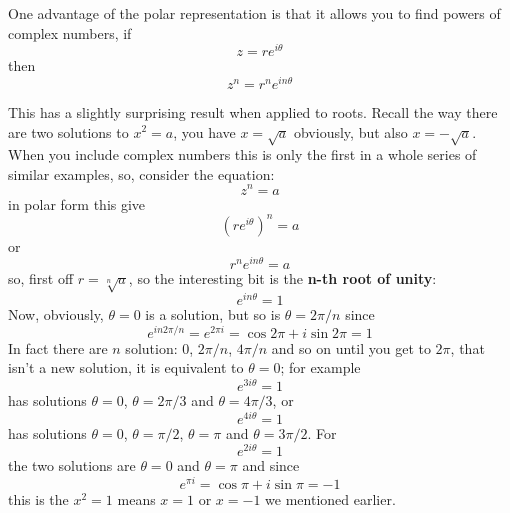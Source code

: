 \documentclass[12pt]{article}
\begin{document}
One advantage of the polar representation is that it allows you to find powers of complex numbers, if
\begin{equation}
  z=re^{i\theta}
\end{equation}
then
\begin{equation}
  z^n=r^ne^{in\theta}
\end{equation}

This has a slightly surprising result when applied to roots. Recall
the way there are two solutions to $x^2=a$, you have $x=\sqrt{a}$
obviously, but also $x=-\sqrt{a}$. When you include complex numbers
this is only the first in a whole series of similar examples, so, consider the equation:
\begin{equation}
  z^n=a
\end{equation}
in polar form this give
\begin{equation}
  \left(re^{i\theta}\right)^n=a
\end{equation}
or
\begin{equation}
  r^ne^{in\theta}=a
\end{equation}
so, first off $r=\sqrt[n]{a}$, so the interesting bit is the \textbf{n-th root of unity}:
\begin{equation}
  e^{in\theta}=1
\end{equation}
Now, obviously, $\theta=0$ is a solution, but so is $\theta=2\pi/n$ since 
\begin{equation}
  e^{in2\pi/n}=e^{2\pi i}=\cos{2\pi}+i\sin{2\pi}=1
\end{equation}
In fact there are $n$ solution: 0, $2\pi/n$, $4\pi/n$ and so on until you get to $2\pi$, that isn't a new solution, it is equivalent to $\theta=0$; for example
\begin{equation}
  e^{3i\theta}=1
\end{equation}
has solutions $\theta=0$, $\theta=2\pi/3$ and $\theta=4\pi/3$, or
\begin{equation}
  e^{4i\theta}=1
\end{equation}
has solutions $\theta=0$, $\theta=\pi/2$, $\theta=\pi$ and $\theta=3\pi/2$. For
\begin{equation}
  e^{2i\theta}=1
\end{equation}
the two solutions are $\theta=0$ and $\theta=\pi$ and since
\begin{equation}
  e^{\pi i}=\cos{\pi}+i\sin{\pi}=-1
\end{equation}
this is the $x^2=1$ means $x=1$ or $x=-1$ we mentioned earlier.
\end{document}
